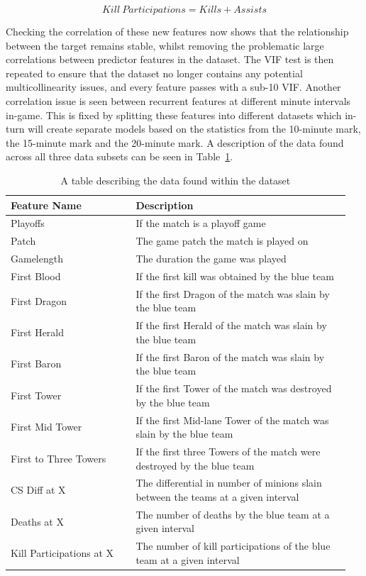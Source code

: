 \[ Kill \: Participations = Kills + Assists \]

Checking the correlation of these new features now shows that the relationship between the target remains stable, whilst removing the problematic large correlations between predictor features in the dataset.
The VIF test is then repeated to ensure that the dataset no longer contains any potential multicollinearity issues, and every feature passes with a sub-10 VIF\@.
Another correlation issue is seen between recurrent features at different minute intervals in-game.
This is fixed by splitting these features into different datasets which in-turn will create separate models based on the statistics from the 10-minute mark, the 15-minute mark and the 20-minute mark.
A description of the data found across all three data subsets can be seen in Table~\ref{tab:DataDescription}. \\

\begin{table}[h]
    \centering
    \caption{A table describing the data found within the dataset}
    \begin{tabular}{p{0.35\linewidth} p{0.6\linewidth}}
        \toprule
        \textbf{Feature Name} & \textbf{Description} \\
        \midrule
        Playoffs & If the match is a playoff game  \\
        Patch & The game patch the match is played on  \\
        Gamelength & The duration the game was played  \\
        First Blood & If the first kill was obtained by the blue team   \\
        First Dragon & If the first Dragon of the match was slain by the blue team   \\
        First Herald & If the first Herald of the match was slain by the blue team    \\
        First Baron & If the first Baron of the match was slain by the blue team   \\
        First Tower & If the first Tower of the match was destroyed by the blue team    \\
        First Mid Tower & If the first Mid-lane Tower of the match was slain by the blue team \\
        First to Three Towers & If the first three Towers of the match were destroyed by the blue team  \\
        CS Diff at X & The differential in number of minions slain between the teams at a given interval  \\
        Deaths at X & The number of deaths by the blue team at a given interval \\
        Kill Participations at X & The number of kill participations of the blue team at a given interval  \\
        \bottomrule
    \end{tabular}
    \label{tab:DataDescription}
\end{table}


